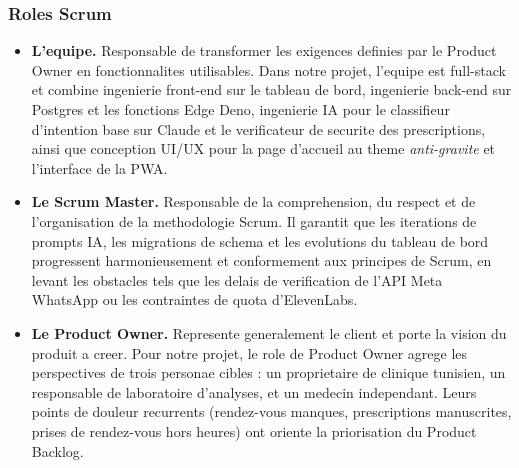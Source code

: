 \subsubsection{Roles Scrum}
\begin{itemize}
  \item \textbf{L'equipe.} Responsable de transformer les exigences
        definies par le Product Owner en fonctionnalites utilisables.
        Dans notre projet, l'equipe est full-stack et combine ingenierie
        front-end sur le tableau de bord, ingenierie back-end sur Postgres
        et les fonctions Edge Deno, ingenierie IA pour le classifieur
        d'intention base sur Claude et le verificateur de securite des
        prescriptions, ainsi que conception UI/UX pour la page d'accueil
        au theme \emph{anti-gravite} et l'interface de la PWA.
  \item \textbf{Le Scrum Master.} Responsable de la comprehension, du
        respect et de l'organisation de la methodologie Scrum. Il garantit
        que les iterations de prompts IA, les migrations de schema et les
        evolutions du tableau de bord progressent harmonieusement et
        conformement aux principes de Scrum, en levant les obstacles tels
        que les delais de verification de l'API Meta WhatsApp ou les
        contraintes de quota d'ElevenLabs.
  \item \textbf{Le Product Owner.} Represente generalement le client et
        porte la vision du produit a creer. Pour notre projet, le role de
        Product Owner agrege les perspectives de trois personae cibles :
        un proprietaire de clinique tunisien, un responsable de
        laboratoire d'analyses, et un medecin independant. Leurs points
        de douleur recurrents (rendez-vous manques, prescriptions
        manuscrites, prises de rendez-vous hors heures) ont oriente la
        priorisation du Product Backlog.
\end{itemize}

